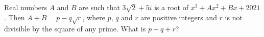 Real numbers $A$ and $B$ are such that $3\sqrt2+5i$ is a root of $x^3+Ax^2+Bx+2021$. Then $A+B=p-q\sqrt r$, where $p$, $q$ and $r$ are positive integers and $r$ is not divisible by the square of any prime. What is $p+q+r$?
